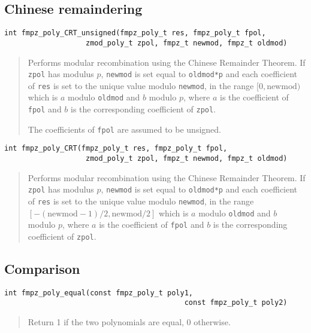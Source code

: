 \documentclass[a4paper,10pt]{article}
\newcommand{\code}{\lstinline}
\begin{document}
\subsection{Chinese remaindering}

\begin{lstlisting}
int fmpz_poly_CRT_unsigned(fmpz_poly_t res, fmpz_poly_t fpol, 
                   zmod_poly_t zpol, fmpz_t newmod, fmpz_t oldmod)
\end{lstlisting}
\begin{quote}
Performs modular recombination using the Chinese Remainder Theorem. If \code{zpol} has modulus $p$, \code{newmod} is set equal to \code{oldmod*p} and each coefficient of \code{res} is set to the unique value modulo \code{newmod}, in the range $[0, \mbox{newmod})$ which is $a$ modulo \code{oldmod} and $b$ modulo $p$, where $a$ is the coefficient of \code{fpol} and $b$ is the corresponding coefficient of \code{zpol}.

The coefficients of \code{fpol} are assumed to be unsigned. 
\end{quote}

\begin{lstlisting}
int fmpz_poly_CRT(fmpz_poly_t res, fmpz_poly_t fpol, 
                   zmod_poly_t zpol, fmpz_t newmod, fmpz_t oldmod)
\end{lstlisting}
\begin{quote}
Performs modular recombination using the Chinese Remainder Theorem. If \code{zpol} has modulus $p$, \code{newmod} is set equal to \code{oldmod*p} and each coefficient of \code{res} is set to the unique value modulo \code{newmod}, in the range $[-(\mbox{newmod} - 1)/2, \mbox{newmod}/2]$ which is $a$ modulo \code{oldmod} and $b$ modulo $p$, where $a$ is the coefficient of \code{fpol} and $b$ is the corresponding coefficient of \code{zpol}. 
\end{quote}

\subsection{Comparison}

\begin{lstlisting}
int fmpz_poly_equal(const fmpz_poly_t poly1, 
                                          const fmpz_poly_t poly2) 
\end{lstlisting}
\begin{quote}
Return 1 if the two polynomials are equal, 0 otherwise.
\end{quote}
\end{document}

